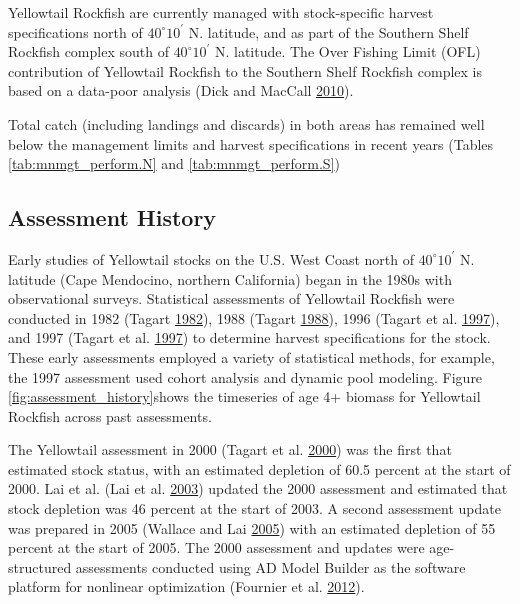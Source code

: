 \documentclass[12pt,]{article}
\begin{document}
Yellowtail Rockfish are currently managed with stock-specific harvest
specifications north of \(40^\circ 10^\prime\) N. latitude, and as part
of the Southern Shelf Rockfish complex south of \(40^\circ 10^\prime\)
N. latitude. The Over Fishing Limit (OFL) contribution of Yellowtail
Rockfish to the Southern Shelf Rockfish complex is based on a data-poor
analysis (Dick and MacCall \protect\hyperlink{ref-Dick2010}{2010}).

Total catch (including landings and discards) in both areas has remained
well below the management limits and harvest specifications in recent
years (Tables \ref{tab:mnmgt_perform.N} and \ref{tab:mnmgt_perform.S})

\subsection{Assessment History}\label{assessment-history}

Early studies of Yellowtail stocks on the U.S. West Coast north of
\(40^\circ 10^\prime\) N. latitude (Cape Mendocino, northern California)
began in the 1980s with observational surveys. Statistical assessments
of Yellowtail Rockfish were conducted in 1982 (Tagart
\protect\hyperlink{ref-Tagart1982}{1982}), 1988 (Tagart
\protect\hyperlink{ref-Tagart1988}{1988}), 1996 (Tagart et al.
\protect\hyperlink{ref-Tagart1997}{1997}), and 1997 (Tagart et al.
\protect\hyperlink{ref-Tagart1997}{1997}) to determine harvest
specifications for the stock. These early assessments employed a variety
of statistical methods, for example, the 1997 assessment used cohort
analysis and dynamic pool modeling. Figure
\ref{fig:assessment_history}shows the timeseries of age 4+ biomass for
Yellowtail Rockfish across past assessments.

The Yellowtail assessment in 2000 (Tagart et al.
\protect\hyperlink{ref-Tagart2000}{2000}) was the first that estimated
stock status, with an estimated depletion of 60.5 percent at the start
of 2000. Lai et al. (Lai et al. \protect\hyperlink{ref-Lai2003}{2003})
updated the 2000 assessment and estimated that stock depletion was 46
percent at the start of 2003. A second assessment update was prepared in
2005 (Wallace and Lai \protect\hyperlink{ref-Wallace2005}{2005}) with an
estimated depletion of 55 percent at the start of 2005. The 2000
assessment and updates were age-structured assessments conducted using
AD Model Builder as the software platform for nonlinear optimization
(Fournier et al. \protect\hyperlink{ref-Fournier2012}{2012}).
\end{document}
